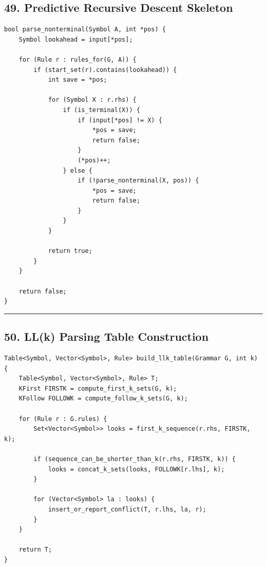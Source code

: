\documentclass[10pt,letterpaper]{article}
\begin{document}
\subsection*{49. Predictive Recursive Descent Skeleton}

\begin{verbatim}
bool parse_nonterminal(Symbol A, int *pos) {
    Symbol lookahead = input[*pos];

    for (Rule r : rules_for(G, A)) {
        if (start_set(r).contains(lookahead)) {
            int save = *pos;

            for (Symbol X : r.rhs) {
                if (is_terminal(X)) {
                    if (input[*pos] != X) {
                        *pos = save;
                        return false;
                    }
                    (*pos)++;
                } else {
                    if (!parse_nonterminal(X, pos)) {
                        *pos = save;
                        return false;
                    }
                }
            }

            return true;
        }
    }

    return false;
}
\end{verbatim}

\medskip\hrule\medskip

\subsection*{50. LL(k) Parsing Table Construction}

\begin{verbatim}
Table<Symbol, Vector<Symbol>, Rule> build_llk_table(Grammar G, int k) {
    Table<Symbol, Vector<Symbol>, Rule> T;
    KFirst FIRSTK = compute_first_k_sets(G, k);
    KFollow FOLLOWK = compute_follow_k_sets(G, k);

    for (Rule r : G.rules) {
        Set<Vector<Symbol>> looks = first_k_sequence(r.rhs, FIRSTK, k);

        if (sequence_can_be_shorter_than_k(r.rhs, FIRSTK, k)) {
            looks = concat_k_sets(looks, FOLLOWK[r.lhs], k);
        }

        for (Vector<Symbol> la : looks) {
            insert_or_report_conflict(T, r.lhs, la, r);
        }
    }

    return T;
}
\end{verbatim}
\end{document}
